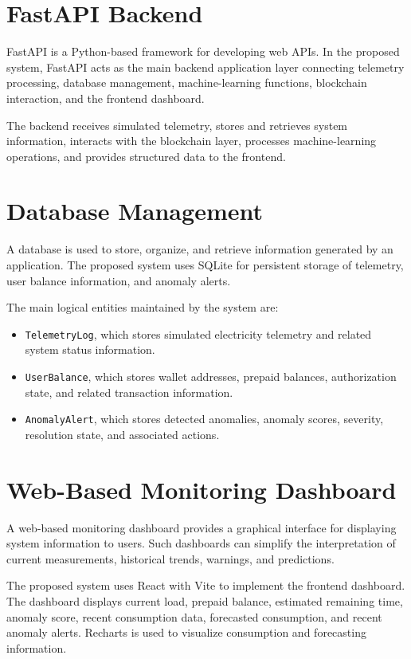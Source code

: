 \section{FastAPI Backend}

FastAPI is a Python-based framework for developing web APIs. In the proposed system, FastAPI acts as the main backend application layer connecting telemetry processing, database management, machine-learning functions, blockchain interaction, and the frontend dashboard.

The backend receives simulated telemetry, stores and retrieves system information, interacts with the blockchain layer, processes machine-learning operations, and provides structured data to the frontend.


\section{Database Management}

A database is used to store, organize, and retrieve information generated by an application. The proposed system uses SQLite for persistent storage of telemetry, user balance information, and anomaly alerts.

The main logical entities maintained by the system are:

\begin{itemize}
    \item \texttt{TelemetryLog}, which stores simulated electricity telemetry and related system status information.
    \item \texttt{UserBalance}, which stores wallet addresses, prepaid balances, authorization state, and related transaction information.
    \item \texttt{AnomalyAlert}, which stores detected anomalies, anomaly scores, severity, resolution state, and associated actions.
\end{itemize}


\section{Web-Based Monitoring Dashboard}

A web-based monitoring dashboard provides a graphical interface for displaying system information to users. Such dashboards can simplify the interpretation of current measurements, historical trends, warnings, and predictions.

The proposed system uses React with Vite to implement the frontend dashboard. The dashboard displays current load, prepaid balance, estimated remaining time, anomaly score, recent consumption data, forecasted consumption, and recent anomaly alerts. Recharts is used to visualize consumption and forecasting information.


